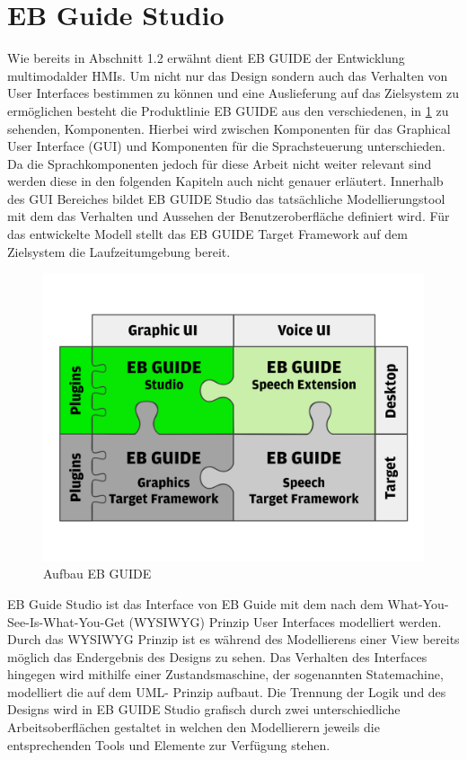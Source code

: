 \section{EB Guide Studio}
Wie bereits in Abschnitt 1.2 erwähnt dient EB GUIDE der Entwicklung multimodalder HMIs.
Um nicht nur das Design sondern auch das Verhalten von User Interfaces bestimmen zu können und eine Auslieferung auf das Zielsystem zu ermöglichen besteht die Produktlinie EB GUIDE aus den verschiedenen, in \cref{fig:guide_puzzle} zu sehenden, Komponenten.
Hierbei wird zwischen Komponenten für das Graphical User Interface (GUI) und Komponenten für die Sprachsteuerung unterschieden.
Da die Sprachkomponenten jedoch für diese Arbeit nicht weiter relevant sind werden diese in den folgenden Kapiteln auch nicht genauer erläutert.
Innerhalb des GUI Bereiches bildet EB GUIDE Studio das tatsächliche Modellierungstool mit dem das Verhalten und Aussehen der Benutzeroberfläche definiert wird.
Für das entwickelte Modell stellt das EB GUIDE Target Framework auf dem Zielsystem die Laufzeitumgebung bereit.\cite{.c} 

\begin{figure} [!h]
\begin{center}
  \includegraphics[scale=0.7]{figures/EB_GUIDE_Puzzle.png}
  \caption{Aufbau EB GUIDE}
  \label{fig:guide_puzzle}
\end{center}
\end{figure}

EB Guide Studio ist das Interface von EB Guide mit dem nach dem What-You-See-Is-What-You-Get (WYSIWYG) Prinzip User Interfaces modelliert werden. 
Durch das WYSIWYG Prinzip ist es während des Modellierens einer View bereits möglich das Endergebnis des Designs zu sehen.
Das Verhalten des Interfaces hingegen wird mithilfe einer Zustandsmaschine, der sogenannten Statemachine, modelliert die auf dem UML- Prinzip aufbaut.
Die Trennung der Logik und des Designs wird in EB GUIDE Studio grafisch durch zwei unterschiedliche Arbeitsoberflächen gestaltet in welchen den Modellierern jeweils die entsprechenden Tools und Elemente zur Verfügung stehen.

